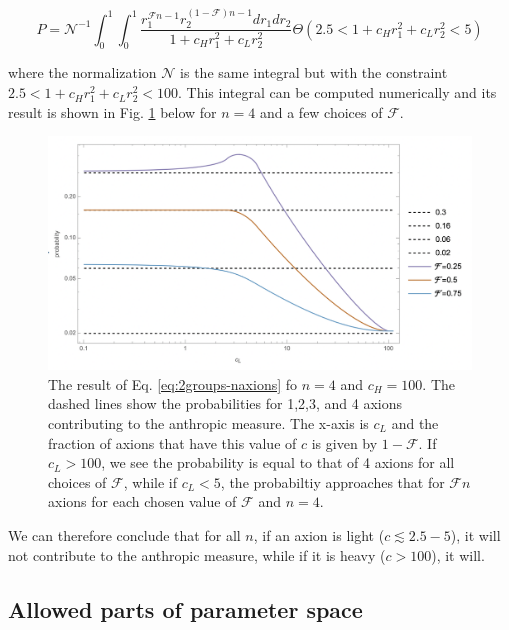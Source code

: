 \documentclass{article}
\begin{document}
\begin{equation}
    \label{eq:2groups-naxions}
    P = \mathcal{N}^{-1}\int_{0}^1\int_{0}^1 \frac{r_1^{\mathcal{F}n-1} r_2^{(1-\mathcal{F})n-1} dr_1 dr_2}{1+c_{H}r_1^2+c_{L}r_2^2}
    \Theta(2.5<1+c_{H}r_1^2+c_{L}r_2^2<5)
\end{equation}

\noindent where the normalization $\mathcal{N}$ is the same integral but with the constraint $2.5<1+c_{H}r_1^2+c_{L}r_2^2<100$. This integral can be computed numerically and its result is shown in Fig. \ref{fig:n-axions-2groups.png} below for $n=4$ and a few choices of $\mathcal{F}$.

\begin{figure}[h]
    \includegraphics[scale=0.55]{figs/n-axions-2groups2.png}
    \centering
    \caption{The result of Eq. \eqref{eq:2groups-naxions} fo $n=4$ and $c_H=100$. The dashed lines show the probabilities for 1,2,3, and 4 axions contributing to the anthropic measure. The x-axis is $c_L$ and the fraction of axions that have this value of $c$ is given by $1-\mathcal{F}$. If $c_L>100$, we see the probability is equal to that of 4 axions for all choices of $\mathcal{F}$, while if $c_L<5$, the probabiltiy approaches that for $\mathcal{F}n$ axions for each chosen value of $\mathcal{F}$ and $n=4$.}
    \label{fig:n-axions-2groups.png}
\end{figure}

We can therefore conclude that for all $n$, if an axion is light ($c\lesssim2.5-5$), it will not contribute to the anthropic measure, while if it is heavy ($c>100$), it will.

\subsection{Allowed parts of parameter space}
\end{document}
